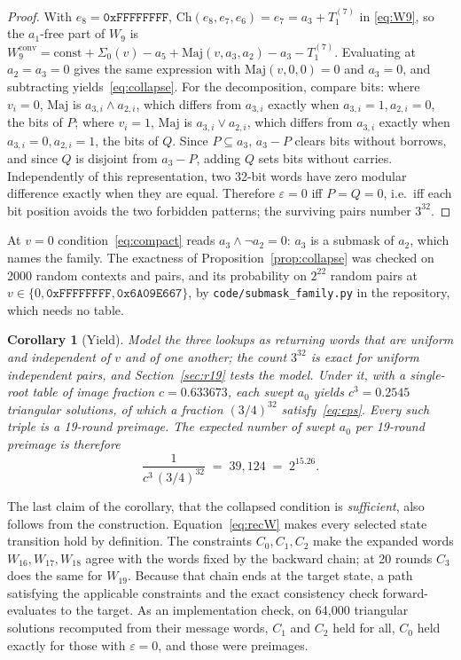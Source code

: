\documentclass[11pt,a4paper]{article}
\newtheorem{corollary}{Corollary}
\newcommand{\Sig}[1]{\Sigma_{#1}}
\newcommand{\Maj}{\mathrm{Maj}}
\newcommand{\Ch}{\mathrm{Ch}}
\newcommand{\hex}[1]{\texttt{#1}}
\begin{document}
\begin{proof}
With $e_8=\hex{0xFFFFFFFF}$, $\Ch(e_8,e_7,e_6)=e_7=a_3+T_1^{(7)}$ in
\eqref{eq:W9}, so the $a_1$-free part of $W_9$ is
$W_9^{\mathrm{conv}} = \text{const} + \Sig0(v) - a_5 + \Maj(v,a_3,a_2) - a_3 - T_1^{(7)}$.
Evaluating at $a_2=a_3=0$ gives the same expression with $\Maj(v,0,0)=0$ and
$a_3=0$, and subtracting yields~\eqref{eq:collapse}.  For the decomposition,
compare bits: where $v_i=0$, $\Maj$ is $a_{3,i}\wedge a_{2,i}$, which differs
from $a_{3,i}$ exactly when $a_{3,i}=1,a_{2,i}=0$, the bits of $P$; where
$v_i=1$, $\Maj$ is $a_{3,i}\vee a_{2,i}$, which differs from $a_{3,i}$ exactly
when $a_{3,i}=0,a_{2,i}=1$, the bits of $Q$.  Since $P\subseteq a_3$,
$a_3-P$ clears bits without borrows, and since $Q$ is disjoint from $a_3-P$,
adding $Q$ sets bits without carries.  Independently of this representation,
two 32-bit words have zero modular difference exactly when they are equal.
Therefore $\varepsilon=0$ iff $P=Q=0$, i.e.\ iff each bit position avoids the
two forbidden patterns; the surviving pairs number $3^{32}$.
\end{proof}

At $v=0$ condition~\eqref{eq:compact} reads $a_3\wedge\neg a_2=0$: $a_3$ is a
submask of $a_2$, which names the family.  The exactness of
Proposition~\ref{prop:collapse} was checked on 2000 random contexts and
pairs, and its probability on $2^{22}$ random pairs at $v\in\{0,
\hex{0xFFFFFFFF}, \hex{0x6A09E667}\}$, by \texttt{code/submask\_family.py}
in the repository, which needs no table.

\begin{corollary}[Yield]
\label{cor:yield}
Model the three lookups as returning words that are uniform and independent of $v$ and of one another; the count $3^{32}$ is exact for uniform independent pairs, and Section~\ref{sec:r19} tests the model.  Under it, with a single-root table of image fraction $c=0.633673$, each swept $a_0$ yields $c^3=0.2545$ triangular solutions, of which a fraction $(3/4)^{32}$ satisfy~\eqref{eq:eps}.  Every such triple is a 19-round preimage.  The
expected number of swept $a_0$ per 19-round preimage is therefore
\[
\frac{1}{c^3\,(3/4)^{32}} \;=\; 39{,}124 \;=\; 2^{15.26}.
\]
\end{corollary}

The last claim of the corollary, that the collapsed condition is
\emph{sufficient}, also follows from the construction.  Equation~\eqref{eq:recW}
makes every selected state transition hold by definition.  The constraints
$C_0,C_1,C_2$ make the expanded words $W_{16},W_{17},W_{18}$ agree with the
words fixed by the backward chain; at 20 rounds $C_3$ does the same for
$W_{19}$.  Because that chain ends at the target state, a path satisfying the
applicable constraints and the exact consistency check forward-evaluates to
the target.  As an implementation check, on 64{,}000 triangular solutions
recomputed from their message words, $C_1$ and $C_2$ held for all, $C_0$ held
exactly for those with $\varepsilon=0$, and those were preimages.
\end{document}
